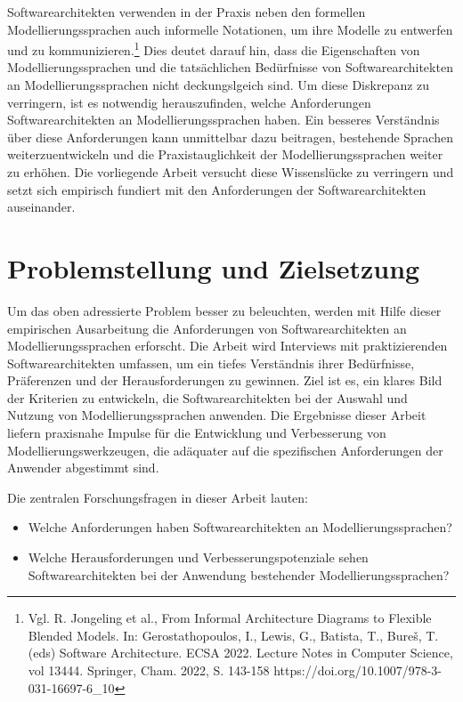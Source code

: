 Softwarearchitekten verwenden in der Praxis neben den formellen Modellierungssprachen auch informelle Notationen, um ihre Modelle zu entwerfen und zu kommunizieren.\footnote{Vgl. R. Jongeling et al., From Informal Architecture Diagrams to Flexible Blended Models. In: Gerostathopoulos, I., Lewis, G., Batista, T., Bureš, T. (eds) Software Architecture. ECSA 2022. Lecture Notes in Computer Science, vol 13444. Springer, Cham. 2022, S. 143-158 https://doi.org/10.1007/978-3-031-16697-6_10} 
Dies deutet darauf hin, dass die Eigenschaften von Modellierungssprachen und die tatsächlichen Bedürfnisse von Softwarearchitekten an Modellierungssprachen nicht deckungslgeich sind. Um diese Diskrepanz zu verringern, ist es notwendig herauszufinden, welche Anforderungen Softwarearchitekten an Modellierungssprachen haben. Ein besseres Verständnis über diese Anforderungen kann unmittelbar dazu beitragen, bestehende Sprachen weiterzuentwickeln und die Praxistauglichkeit der Modellierungssprachen weiter zu erhöhen. Die vorliegende Arbeit versucht diese Wissenslücke zu verringern und setzt sich empirisch fundiert mit den Anforderungen der Softwarearchitekten auseinander.



\section{Problemstellung und Zielsetzung}
\label{sec:semant-textauszeichnung}

Um das oben adressierte Problem besser zu beleuchten, werden mit Hilfe dieser empirischen Ausarbeitung die Anforderungen von Softwarearchitekten an Modellierungssprachen erforscht. Die Arbeit wird Interviews mit praktizierenden Softwarearchitekten umfassen, um ein tiefes Verständnis ihrer Bedürfnisse, Präferenzen und der Herausforderungen zu gewinnen. Ziel ist es, ein klares Bild der Kriterien zu entwickeln, die Softwarearchitekten bei der Auswahl und Nutzung von Modellierungssprachen anwenden. Die Ergebnisse dieser Arbeit liefern praxisnahe Impulse für die Entwicklung und Verbesserung von Modellierungswerkzeugen, die adäquater auf die spezifischen Anforderungen der Anwender abgestimmt sind.

Die zentralen Forschungsfragen in dieser Arbeit lauten: 

\begin{itemize}
  \item Welche Anforderungen haben Softwarearchitekten an Modellierungssprachen?
  \item Welche Herausforderungen und Verbesserungspotenziale sehen Softwarearchitekten bei der Anwendung bestehender Modellierungssprachen?
\end{itemize}

